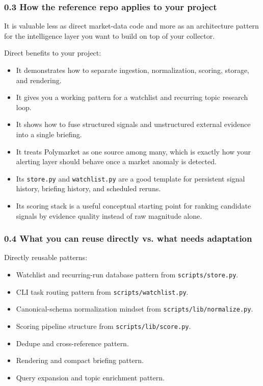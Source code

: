 \documentclass[
]{article}
\providecommand{\tightlist}{%
  \setlength{\itemsep}{0pt}\setlength{\parskip}{0pt}}
\begin{document}
\subsubsection{0.3 How the reference repo applies to your
project}\label{03-how-the-reference-repo-applies-to-your-project}

It is valuable less as direct market-data code and more as an
architecture pattern for the intelligence layer you want to build on top
of your collector.

Direct benefits to your project:

\begin{itemize}
\tightlist
\item
  It demonstrates how to separate ingestion, normalization, scoring,
  storage, and rendering.
\item
  It gives you a working pattern for a watchlist and recurring topic
  research loop.
\item
  It shows how to fuse structured signals and unstructured external
  evidence into a single briefing.
\item
  It treats Polymarket as one source among many, which is exactly how
  your alerting layer should behave once a market anomaly is detected.
\item
  Its \texttt{store.py} and \texttt{watchlist.py} are a good template
  for persistent signal history, briefing history, and scheduled reruns.
\item
  Its scoring stack is a useful conceptual starting point for ranking
  candidate signals by evidence quality instead of raw magnitude alone.
\end{itemize}

\subsubsection{0.4 What you can reuse directly vs. what needs
adaptation}\label{04-what-you-can-reuse-directly-vs-what-needs-adaptation}

Directly reusable patterns:

\begin{itemize}
\tightlist
\item
  Watchlist and recurring-run database pattern from
  \texttt{scripts/store.py}.
\item
  CLI task routing pattern from \texttt{scripts/watchlist.py}.
\item
  Canonical-schema normalization mindset from
  \texttt{scripts/lib/normalize.py}.
\item
  Scoring pipeline structure from \texttt{scripts/lib/score.py}.
\item
  Dedupe and cross-reference pattern.
\item
  Rendering and compact briefing pattern.
\item
  Query expansion and topic enrichment pattern.
\end{itemize}
\end{document}
